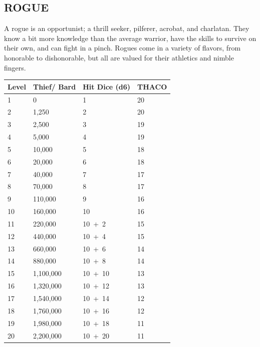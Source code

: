 \begin{multicols}{2}
\section{ROGUE}

A rogue is an opportunist; a thrill seeker, pilferer, acrobat, and charlatan.  They know a bit more knowledge than the average warrior, have the skills to survive on their own, and can fight in a pinch.  Rogues come in a variety of flavors, from honorable to dishonorable, but all are valued for their athletics and nimble fingers.

\noindent
\begin{minipage}{\columnwidth}

\label{rogueadvancement}
\noindent
\begin{tabular}{|m{}|m{}|m{}|m{}|}
\hline
Level	& Thief/ Bard	& Hit Dice (d6)	& THACO \\
\hline\hline
\rowcolor[gray]{.9}1	& 0			& 1		& 20 \\
2	& 1,250		& 2		& 20 \\
\rowcolor[gray]{.9}3	& 2,500		& 3		& 19 \\
4	& 5,000		& 4		& 19 \\
\rowcolor[gray]{.9}5	& 10,000	& 5		& 18 \\
6	& 20,000	& 6		& 18 \\
\rowcolor[gray]{.9}7	& 40,000	& 7		& 17 \\
8	& 70,000	& 8		& 17 \\
\rowcolor[gray]{.9}9	& 110,000	& 9		& 16 \\
10	& 160,000	& 10	& 16 \\
\rowcolor[gray]{.9}11	& 220,000	& 10~+~2	& 15 \\
12	& 440,000	& 10~+~4	& 15 \\
\rowcolor[gray]{.9}13	& 660,000	& 10~+~6	& 14 \\
14	& 880,000	& 10~+~8	& 14 \\
\rowcolor[gray]{.9}15	& 1,100,000	& 10~+~10	& 13 \\
16	& 1,320,000	& 10~+~12	& 13 \\
\rowcolor[gray]{.9}17	& 1,540,000	& 10~+~14	& 12 \\
18	& 1,760,000	& 10~+~16	& 12 \\
\rowcolor[gray]{.9}19	& 1,980,000	& 10~+~18	& 11 \\
20	& 2,200,000	& 10~+~20	& 11 \\
\hline
\end{tabular}


\end{minipage}
\end{multicols}
